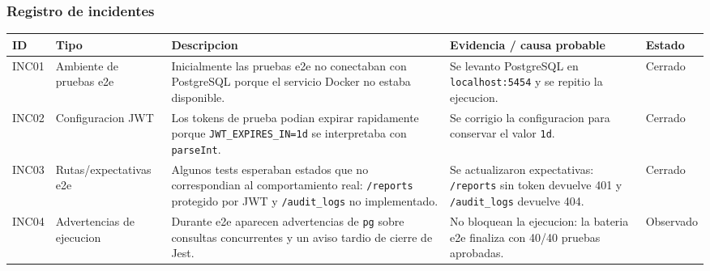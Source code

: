 \documentclass{article}
\begin{document}
\subsubsection{Registro de incidentes}
\begin{longtable}{p{1.2cm} p{3.0cm} p{3.4cm} p{4.5cm} p{2.4cm}}
    \toprule
    \textbf{ID} & \textbf{Tipo}             & \textbf{Descripcion}                                                                                                                                      & \textbf{Evidencia / causa probable}                                                                          & \textbf{Estado} \\
    \midrule
    INC01       & Ambiente de pruebas e2e   & Inicialmente las pruebas e2e no conectaban con PostgreSQL porque el servicio Docker no estaba disponible.                                                 & Se levanto PostgreSQL en \texttt{localhost:5454} y se repitio la ejecucion.                                  & Cerrado         \\
    INC02       & Configuracion JWT         & Los tokens de prueba podian expirar rapidamente porque \texttt{JWT\_EXPIRES\_IN=1d} se interpretaba con \texttt{parseInt}.                                & Se corrigio la configuracion para conservar el valor \texttt{1d}.                                            & Cerrado         \\
    INC03       & Rutas/expectativas e2e    & Algunos tests esperaban estados que no correspondian al comportamiento real: \texttt{/reports} protegido por JWT y \texttt{/audit\_logs} no implementado. & Se actualizaron expectativas: \texttt{/reports} sin token devuelve 401 y \texttt{/audit\_logs} devuelve 404. & Cerrado         \\
    INC04       & Advertencias de ejecucion & Durante e2e aparecen advertencias de \texttt{pg} sobre consultas concurrentes y un aviso tardio de cierre de Jest.                                        & No bloquean la ejecucion: la bateria e2e finaliza con 40/40 pruebas aprobadas.                               & Observado       \\
    \bottomrule
\end{longtable}
\end{document}
